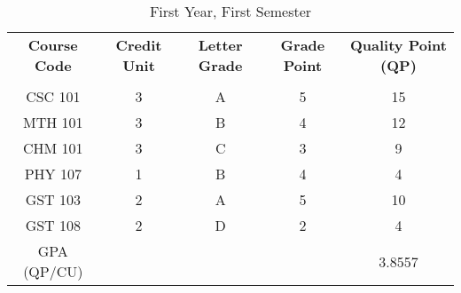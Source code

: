 \documentclass{article}
\begin{document}
\begin{table}[h!]
	\begin{center}
		\caption{First Year, First Semester}
		\label{tab:table1}
		\begin{tabular}{|c|S|S|S|c|}
			\textbf{Course Code} & \textbf{Credit Unit} & 
			\textbf{Letter Grade} &
			\textbf{Grade Point} &
			\textbf{Quality Point (QP)}\\
			 &  &  &  &   \\
			\hline
			CSC 101 & 3 & A & 5 & 15\\
			MTH 101 & 3 & B & 4 & 12\\
			CHM 101 & 3 & C & 3 & 9\\
			PHY 107 & 1 & B & 4 & 4\\
			GST 103 & 2 & A & 5 & 10\\
			GST 108 & 2 & {D} & 2 & 4\\
			GPA (QP/CU) &   &   &   & 3.8557\\
			\hline
		\end{tabular}
	\end{center}
\end{table}
\end{document}
